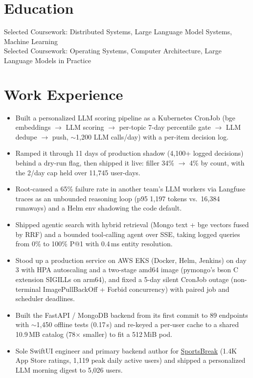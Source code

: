 \documentclass[11pt, letterpaper]{article}
\begin{document}

\section{Education}
Selected Coursework: Distributed Systems, Large Language Model Systems, Machine Learning\\[1pt]
Selected Coursework: Operating Systems, Computer Architecture, Large Language Models in Practice

\section{Work Experience}
\begin{itemize}
  \item Built a personalized LLM scoring pipeline as a Kubernetes CronJob (bge embeddings $\to$ LLM scoring $\to$ per-topic 7-day percentile gate $\to$ LLM dedupe $\to$ push, $\sim$1{,}200 LLM calls/day) with a per-item decision log.
  \item Ramped it through 11 days of production shadow (4{,}100+ logged decisions) behind a dry-run flag, then shipped it live: filler 34\% $\to$ 4\% by count, with the 2/day cap held over 11{,}745 user-days.
  \item Root-caused a 65\% failure rate in another team's LLM workers via Langfuse traces as an unbounded reasoning loop (p95 1{,}197 tokens vs.\ 16{,}384 runaways) and a Helm env shadowing the code default.
  \item Shipped agentic search with hybrid retrieval (Mongo text + bge vectors fused by RRF) and a bounded tool-calling agent over SSE, taking logged queries from 0\% to 100\% P@1 with 0.4\,ms entity resolution.
  \item Stood up a production service on AWS EKS (Docker, Helm, Jenkins) on day 3 with HPA autoscaling and a two-stage amd64 image (pymongo's bson C extension SIGILLs on arm64), and fixed a 5-day silent CronJob outage (non-terminal ImagePullBackOff + Forbid concurrency) with paired job and scheduler deadlines.
  \item Built the FastAPI / MongoDB backend from its first commit to 89 endpoints with $\sim$1{,}450 offline tests (0.17\,s) and re-keyed a per-user cache to a shared 10.9\,MB catalog (78$\times$ smaller) to fit a 512\,MiB pod.
  \item Sole SwiftUI engineer and primary backend author for \href{https://apps.apple.com/app/id6762649287}{SportsBreak} (1.4K App Store ratings, 1{,}119 peak daily active users) and shipped a personalized LLM morning digest to 5{,}026 users.
\end{itemize}
\end{document}

